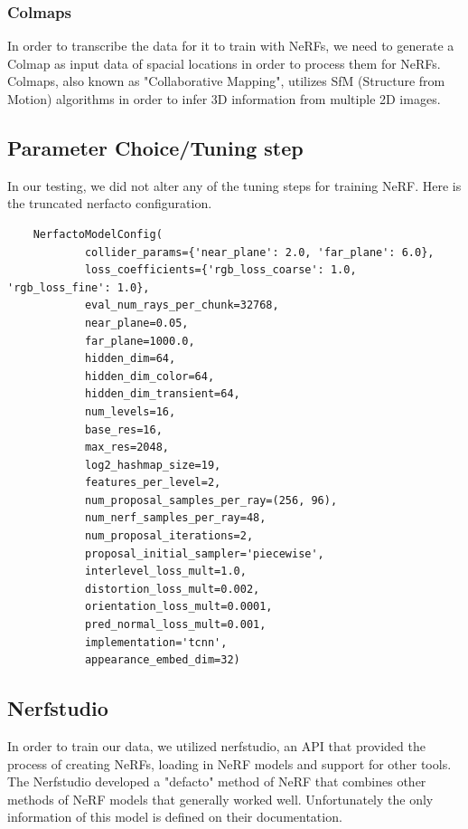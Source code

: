\documentclass{article}
\begin{document}
\subsubsection{Colmaps}

In order to transcribe the data for it to train with NeRFs, we need to generate a Colmap as input data of spacial locations in order to process them for NeRFs. Colmaps, also known as "Collaborative Mapping", utilizes SfM (Structure from Motion) algorithms in order to infer 3D information from multiple 2D images. 

\subsection{Parameter Choice/Tuning step}

In our testing, we did not alter any of the tuning steps for training NeRF. Here is the truncated nerfacto configuration.

\begin{verbatim}
    NerfactoModelConfig(
            collider_params={'near_plane': 2.0, 'far_plane': 6.0},
            loss_coefficients={'rgb_loss_coarse': 1.0, 'rgb_loss_fine': 1.0},
            eval_num_rays_per_chunk=32768,
            near_plane=0.05,
            far_plane=1000.0,
            hidden_dim=64,
            hidden_dim_color=64,
            hidden_dim_transient=64,
            num_levels=16,
            base_res=16,
            max_res=2048,
            log2_hashmap_size=19,
            features_per_level=2,
            num_proposal_samples_per_ray=(256, 96),
            num_nerf_samples_per_ray=48,
            num_proposal_iterations=2,
            proposal_initial_sampler='piecewise',
            interlevel_loss_mult=1.0,
            distortion_loss_mult=0.002,
            orientation_loss_mult=0.0001,
            pred_normal_loss_mult=0.001,
            implementation='tcnn',
            appearance_embed_dim=32)
\end{verbatim}

\subsection{Nerfstudio}

In order to train our data, we utilized nerfstudio, an API that provided the process of creating NeRFs, loading in NeRF models and support for other tools. The Nerfstudio developed a "defacto" method of NeRF that combines other methods of NeRF models that generally worked well. Unfortunately the only information of this model is defined on their documentation.
\end{document}

